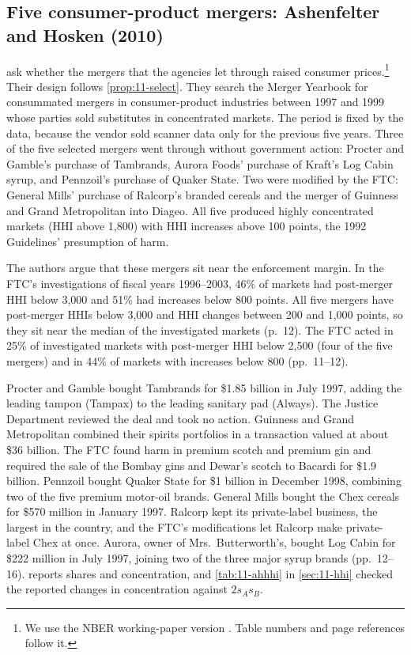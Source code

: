 \subsection{Five consumer-product mergers: Ashenfelter and Hosken (2010)}\label{sec:11-ah}

 \citet{AshenfelterHosken2010} ask whether the mergers that the agencies let through
raised consumer prices.\footnote{We use the NBER working-paper version \citep{AshenfelterHosken2008}. Table
numbers and page references follow it.} Their design follows \cref{prop:11-select}. They search the Merger
Yearbook for consummated mergers in consumer-product industries between 1997 and 1999 whose parties sold
substitutes in concentrated markets. The period is fixed by the data, because the vendor sold scanner data only
for the previous five years. Three of the five selected mergers went through without government action:
Procter and Gamble's purchase of Tambrands, Aurora Foods' purchase of Kraft's Log Cabin syrup, and Pennzoil's
purchase of Quaker State. Two were modified by the FTC: General Mills' purchase of Ralcorp's branded cereals and
the merger of Guinness and Grand Metropolitan into Diageo. All five produced highly concentrated markets (HHI above
1,800) with HHI increases above 100 points, the 1992 Guidelines' presumption of harm.

The authors argue that these mergers sit near the enforcement margin. In the FTC's investigations of fiscal years
1996--2003, 46\% of markets had post-merger HHI below 3,000 and 51\% had increases below 800 points. All five
mergers have post-merger HHIs below 3,000 and HHI changes between 200 and 1,000 points, so they sit near the median
of the investigated markets (p.~12). The FTC acted in 25\% of investigated markets with post-merger HHI below 2,500
(four of the five mergers) and in 44\% of markets with increases below 800 (pp.~11--12).

 Procter and Gamble bought Tambrands for \$1.85 billion in July 1997, adding the leading
tampon (Tampax) to the leading sanitary pad (Always). The Justice Department reviewed the deal and took no
action. Guinness and Grand Metropolitan combined their spirits portfolios in a transaction valued at about \$36
billion. The FTC found harm in premium scotch and premium gin and required the sale of the Bombay gins and Dewar's
scotch to Bacardi for \$1.9 billion. Pennzoil bought Quaker State for \$1 billion in December 1998, combining two
of the five premium motor-oil brands. General Mills bought the Chex cereals for \$570 million in January 1997.
Ralcorp kept its private-label business, the largest in the country, and the FTC's modifications let Ralcorp make
private-label Chex at once. Aurora, owner of Mrs.\ Butterworth's, bought Log Cabin for \$222 million in July 1997,
joining two of the three major syrup brands (pp.~12--16).  reports shares and concentration,
and \cref{tab:11-ahhhi} in \cref{sec:11-hhi} checked the reported changes in concentration against $2s_As_B$.


